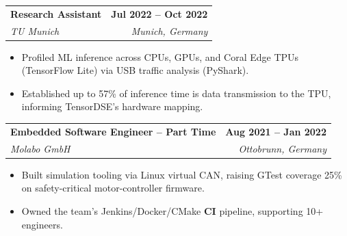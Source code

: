 \documentclass[letterpaper,11pt]{article}
\makeatletter
\newcommand{\resumeItem}[1]{
  \item\small{
    {#1 \vspace{-2pt}}
  }
}
\newcommand{\resumeSubheading}[4]{
  \vspace{-2pt}\item
    \begin{tabular*}{1.0\textwidth}[t]{l@{\extracolsep{\fill}}r}
      \textbf{#1} & \textbf{\small #2} \\
      \textit{\small#3} & \textit{\small #4} \\
    \end{tabular*}\vspace{-7pt}
}
\newcommand{\resumeItemListStart}{\begin{itemize}}
\newcommand{\resumeItemListEnd}{\end{itemize}\vspace{-5pt}}
\makeatother
\begin{document}
        \resumeSubheading
            {Research Assistant}{Jul 2022 -- Oct 2022}
            {TU Munich}{Munich, Germany}
            \resumeItemListStart
                \resumeItem{Profiled ML inference across CPUs, GPUs, and Coral Edge TPUs (TensorFlow Lite) via USB traffic analysis (PyShark).}
                \resumeItem{Established up to 57\% of inference time is data transmission to the TPU, informing TensorDSE's hardware mapping.}
            \resumeItemListEnd

        \resumeSubheading
            {Embedded Software Engineer -- Part Time}{Aug 2021 -- Jan 2022}
            {Molabo GmbH}{Ottobrunn, Germany}
            \resumeItemListStart
                \resumeItem{Built simulation tooling via Linux virtual CAN, raising GTest coverage 25\% on safety-critical motor-controller firmware.}
                \resumeItem{Owned the team's Jenkins/Docker/CMake \textbf{CI} pipeline, supporting 10+ engineers.}
            \resumeItemListEnd
\end{document}
